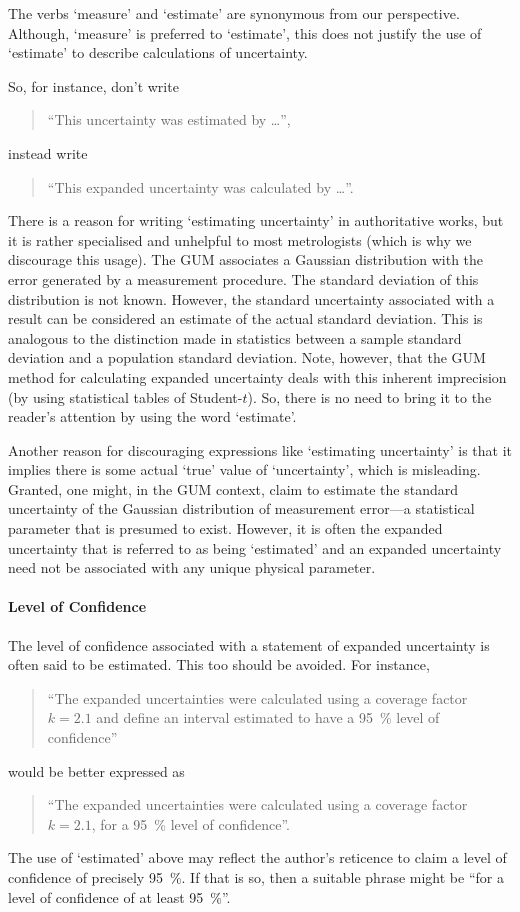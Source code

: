 The verbs `measure' and `estimate' are synonymous from our perspective. Although, `measure' is preferred to `estimate', this does not justify the use of `estimate' to describe calculations of uncertainty.  

So, for instance, don't write
\begin{quote}
``This uncertainty was estimated by …'',
\end{quote}
instead write
\begin{quote}
``This expanded uncertainty was calculated by …''.
\end{quote}
There is a reason for writing  `estimating uncertainty' in authoritative works, but it is rather specialised and unhelpful to most metrologists (which is why we discourage this usage). The GUM associates a Gaussian distribution with the error generated by a measurement procedure. The standard deviation of this  distribution is not known. However, the standard uncertainty associated with a result can be considered an estimate of the actual standard deviation. This is analogous to the distinction made in statistics between a sample standard deviation and a population standard deviation. Note, however, that the GUM method for calculating expanded uncertainty deals with this inherent imprecision (by using statistical tables of Student-$t$). So, there is no need to bring it to the reader's attention by using the word `estimate'.

Another reason for discouraging expressions like `estimating uncertainty' is that it implies there is some actual `true' value of `uncertainty', which is misleading. Granted, one might, in the GUM context, claim to estimate the standard uncertainty of the Gaussian distribution of measurement error–--a statistical parameter that is presumed to exist. However, it is often the expanded uncertainty that is referred to as being `estimated' and an expanded uncertainty need not be associated with any unique physical parameter.

\paragraph{Level of Confidence}
The level of confidence associated with a statement of expanded uncertainty is often said to be estimated. This too should be avoided. For instance,
\begin{quote}
``The expanded uncertainties were calculated using a coverage factor $k = 2.1$ and define an interval estimated to have a \SI{95}{\%} level of confidence''
\end{quote}
would be better expressed as
\begin{quote}
``The expanded uncertainties were calculated using a coverage factor $k = 2.1$, for a \SI{95}{\%} level of confidence''.
\end{quote}
The use of `estimated' above may reflect the author's reticence to claim a level of confidence of precisely \SI{95}{\%}. If that is so, then a suitable phrase might be ``for a level of confidence of at least \SI{95}{\%}''. 

